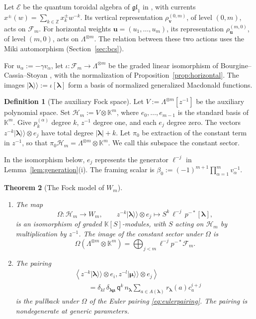 \documentclass[11pt]{amsart}
\newtheorem{theorem}{Theorem}[section]
\theoremstyle{definition}
\newtheorem{definition}[theorem]{Definition}
\theoremstyle{remark}
\newcommand{\Mq}{\mathsf q}                      %
\newcommand{\K}{\mathbb K}                       %
\newcommand{\bv}{{\mathbf v}}                    %
\newcommand{\betaz}{\beta_0}                     %
\newcommand{\La}{\Lambda}                        %
\newcommand{\bl}{{\boldsymbol{\lambda}}}         %
\newcommand{\bmu}{{\boldsymbol{\mu}}}
\newcommand{\Add}[1]{A(#1)}                      %
\newcommand{\res}[2]{r_{#1}(#2)}                 %
\newcommand{\srcnorm}[1]{n_{#1}}                 %
\newcommand{\ip}[2]{\left\langle #1,#2\right\rangle}
\newcommand{\ceig}[1]{c_{#1}}                    %
\newcommand{\Fock}[1]{\mathcal F_{#1}}            %
\newcommand{\Wsp}[1]{W_{#1}}                     %
\newcommand{\HH}{\mathcal H}
\newcommand{\Hsp}[1]{\HH_{#1}}                   %
\newcommand{\Csec}[1]{\La^{\otimes #1}\otimes\K^{#1}}   %
\newcommand{\auxe}[1]{e_{#1}}                    %
\newcommand{\kket}[1]{\lvert #1\rangle\!\rangle} %
\newcommand{\fix}[1]{[#1]}                       %
\newcommand{\taut}{\ell}                         %
\newcommand{\pulm}{p^{-*}}                       %
\newcommand{\Shift}{S}                           %
\newcommand{\Omap}{\Omega}                       %
\newcommand{\bu}{{\mathbf u}}                    %
\newcommand{\pk}[2]{p_{#1}^{(#2)}}               %
\newcommand{\Hiso}{\iota}                        %
\newcommand{\piz}{\pi_0}                         %
\newcommand{\rhov}{\rho^{(0,m)}_{\bv}}           %
\newcommand{\rhou}{\rho^{(m,0)}_{\bu}}           %
\begin{document}
Let \(\mathcal E\) be the quantum toroidal algebra of \(\mathfrak{gl}_1\) in
\cite[Section~2.1]{BCS}, with currents \(x^\pm(w)=\sum_{k\in\mathbb Z}x^\pm_k w^{-k}\).
Its vertical representation \(\rhov\), of level \((0,m)\), acts on \(\Fock{m}\).
For horizontal weights \(\bu=(u_1,\dots,u_m)\), its representation \(\rhou\),
of level \((m,0)\), acts on \(\La^{\otimes m}\). The relation between these two
actions uses the Miki automorphism (Section~\ref{sec:bcs}).

For \(u_\alpha:=-\gamma v_\alpha\), let
\(\Hiso\colon\Fock{m}\to\La^{\otimes m}\) be the graded linear isomorphism of
Bourgine--Cassia--Stoyan \cite[Section~3.3]{BCS}, with the normalization of
Proposition~\ref{prop:horizontal}. The images
\(\kket{\bl}:=\Hiso\fix{\bl}\) form a basis of normalized generalized
Macdonald functions.

\begin{definition}[The auxiliary Fock space]\label{def:auxiliary}
Let \(V:=\La^{\otimes m}[z^{-1}]\) be the auxiliary polynomial space.
Set \(\Hsp{m}:=V\otimes\K^m\), where
\(\auxe{0},\dots,\auxe{m-1}\) is the standard basis of \(\K^m\).
Give \(\pk{k}{\alpha}\) degree \(k\), \(z^{-1}\) degree one, and each \(\auxe{j}\) degree zero.
The vectors \(z^{-k}\kket{\bl}\otimes\auxe{j}\) have total degree \(|\bl|+k\).
Let \(\piz\) be extraction of the constant term in \(z^{-1}\), so that
\(\piz\Hsp{m}=\Csec{m}\). We call this subspace the constant sector.
\end{definition}

In the isomorphism below, \(\auxe{j}\) represents the generator \(\taut^{-j}\) in
Lemma~\ref{lem:generation}(i). The framing scalar is
\(\betaz:=(-1)^{m+1}\prod_{\alpha=1}^m v_\alpha^{-1}\).

\begin{theorem}[The Fock model of \(\Wsp{m}\)]\label{thm:fock}
\begin{enumerate}
\item[(i)] The map
\[
 \Omap\colon\Hsp{m}\to\Wsp{m},\qquad
 z^{-k}\kket{\bl}\otimes\auxe{j}\longmapsto\Shift^k\,\taut^{-j}\,\pulm\fix{\bl},
\]
is an isomorphism of graded \(\K[\Shift]\)-modules, with \(\Shift\) acting on \(\Hsp{m}\)
by multiplication by \(z^{-1}\). The image of the constant sector under \(\Omap\) is
\[
 \Omap(\Csec{m})=\bigoplus_{j<m}\taut^{-j}\pulm\Fock{m}.
\]
\item[(ii)] The pairing
\[
 \begin{aligned}
 &\ip{z^{-k}\kket{\bl}\otimes\auxe{i}}{z^{-l}\kket{\bmu}\otimes\auxe{j}}\\
 &\qquad=\delta_{kl}\,\delta_{\bl\bmu}\,\Mq^k\,\srcnorm{\bl}
       \sum_{a\in\Add{\bl}}\res{\bl}{a}\ceig{a}^{i+j}
 \end{aligned}
\]
is the pullback under \(\Omap\) of the Euler pairing \eqref{eq:eulerpairing}.
The pairing is nondegenerate at generic parameters.
\end{enumerate}
\end{theorem}
\end{document}

